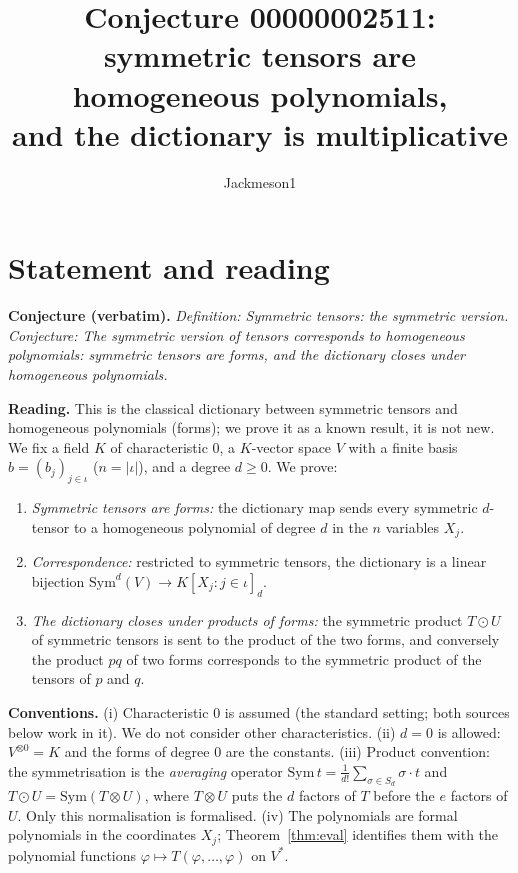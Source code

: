 \documentclass[11pt]{article}
\title{Conjecture 00000002511: symmetric tensors are homogeneous polynomials,\\ and the dictionary is multiplicative}
\author{Jackmeson1}
\date{}
\theoremstyle{definition}
\begin{document}
\maketitle

\section{Statement and reading}

\textbf{Conjecture (verbatim).} \emph{Definition: Symmetric tensors: the symmetric version.
Conjecture: The symmetric version of tensors corresponds to homogeneous polynomials: symmetric
tensors are forms, and the dictionary closes under homogeneous polynomials.}

\textbf{Reading.} This is the classical dictionary between symmetric tensors and homogeneous
polynomials (forms); we prove it as a known result, it is not new. We fix a field $K$ of
characteristic $0$, a $K$-vector space $V$ with a finite basis $b=(b_j)_{j\in\iota}$
($n=|\iota|$), and a degree $d\ge 0$. We prove:
\begin{enumerate}
\item[(a)] \emph{Symmetric tensors are forms:} the dictionary map sends every symmetric
  $d$-tensor to a homogeneous polynomial of degree $d$ in the $n$ variables $X_j$.
\item[(b)] \emph{Correspondence:} restricted to symmetric tensors, the dictionary is a linear
  bijection $\mathrm{Sym}^d(V)\to K[X_j: j\in\iota]_d$.
\item[(c)] \emph{The dictionary closes under products of forms:} the symmetric product
  $T\odot U$ of symmetric tensors is sent to the product of the two forms, and conversely the
  product $pq$ of two forms corresponds to the symmetric product of the tensors of $p$ and $q$.
\end{enumerate}
\textbf{Conventions.} (i) Characteristic $0$ is assumed (the standard setting; both sources
below work in it). We do not consider other characteristics. (ii) $d=0$ is allowed:
$V^{\otimes 0}=K$ and the forms of degree $0$ are the constants. (iii) Product convention: the
symmetrisation is the \emph{averaging} operator $\mathrm{Sym}\,t=\frac1{d!}\sum_{\sigma\in S_d}
\sigma\cdot t$ and $T\odot U=\mathrm{Sym}(T\otimes U)$, where $T\otimes U$ puts the $d$ factors of
$T$ before the $e$ factors of $U$. Only this normalisation is formalised. (iv) The polynomials are formal polynomials in the
coordinates $X_j$; Theorem~\ref{thm:eval} identifies them with the polynomial functions
$\varphi\mapsto T(\varphi,\dots,\varphi)$ on $V^*$.
\end{document}
